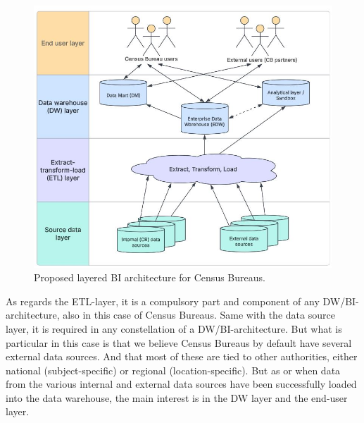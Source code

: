 \begin{figure}[h] %
  \centering
  \includegraphics[width=1.0\textwidth]{Figures/Q1_BI_architecture.jpg}
  \caption{Proposed layered BI architecture for Census Bureaus.}
  \label{fig:BI_arch}
\end{figure}

As regards the ETL-layer, it is a compulsory part and component of any DW/BI-architecture, also in this case of Census Bureaus. Same with the data source layer, it is required in any constellation of a DW/BI-architecture. But what is particular in this case is that we believe Census Bureaus by default have several external data sources. And that most of these are tied to other authorities, either national (subject-specific) or regional (location-specific). But as or when data from the various internal and external data sources have been successfully loaded into the data warehouse, the main interest is in the DW layer and the end-user layer.  


